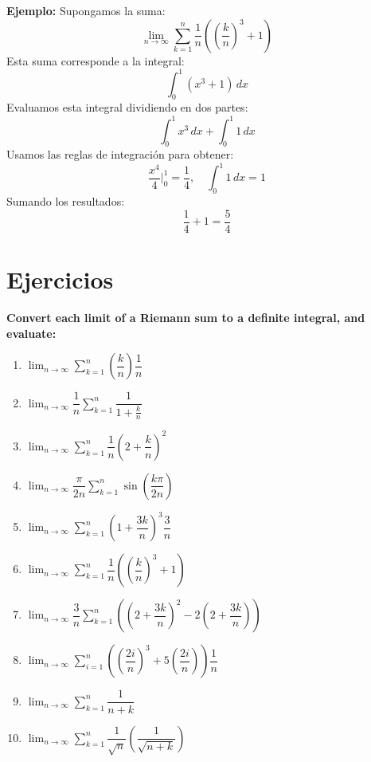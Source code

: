 \documentclass[answers]{exam} %
\begin{document}
\textbf{Ejemplo:}
Supongamos la suma:
\[
\lim_{n \to \infty} \sum_{k=1}^{n} \frac{1}{n} \left( \left( \frac{k}{n} \right)^3 + 1 \right)
\]
Esta suma corresponde a la integral:
\[
\int_0^1 (x^3 + 1) \, dx
\]
Evaluamos esta integral dividiendo en dos partes:
\[
\int_0^1 x^3 \, dx + \int_0^1 1 \, dx
\]
Usamos las reglas de integración para obtener:
\[
\frac{x^4}{4} \Big|_0^1 = \frac{1}{4}, \quad \int_0^1 1 \, dx = 1
\]
Sumando los resultados:
\[
\frac{1}{4} + 1 = \frac{5}{4}
\]




\section{Ejercicios}

    \large\textbf{Convert each limit of a Riemann sum to a definite integral, and evaluate: }

    \begin{enumerate}[label=\alph*.]
        \item $\displaystyle \lim_{n\to\infty} \sum_{k = 1}^{n} \left(\dfrac{k}{n} \right) \dfrac{1} {n}$
        
        \item $\displaystyle \lim_{n\to\infty} \dfrac{1}{n} \sum_{k = 1}^{n} \dfrac{1} {1+\frac{k}{n}}$
        
        \item $\displaystyle \lim_{n\to\infty} \sum_{k = 1}^{n} \dfrac{1}{n} \left(2+\dfrac{k}{n}\right)^2$
        
        \item $\displaystyle \lim_{n\to\infty} \dfrac{\pi}{2n} \sum_{k = 1}^{n} \sin \left(\dfrac{k\pi}{2n}\right)$
        
        \item $\displaystyle \lim_{n\to\infty} \sum_{k = 1}^{n} \left(1+ \dfrac{3k}{n}\right)^3 \dfrac{3}{n}$
        
        \item $\displaystyle \lim_{n\to\infty} \sum_{k = 1}^{n} \dfrac{1}{n} \left(\left(\dfrac{k}{n}\right) ^3 + 1\right)$
        
        \item $\displaystyle \lim_{n\to\infty} \dfrac{3}{n} \sum_{k = 1}^{n} \left(\left(2+ \dfrac{3k}{n}\right) ^2- 2\left(2+\dfrac{3k}{n}\right)\right) $
        
        \item $\displaystyle \lim_{n\to\infty} \sum_{i = 1}^{n} \left(\left(\dfrac{2i}{n}\right) ^3 + 5\left(\dfrac{2i}{n}\right)\right)  \dfrac{1}{n} $
        
        \item $\displaystyle \lim_{n\to\infty} \sum_{k = 1}^{n} \dfrac{1}{n+k}$
        \item $\displaystyle \lim_{n\to\infty} \sum_{k = 1}^{n} \dfrac{1}{\sqrt{n}} \left(\dfrac{1}{\sqrt{n+k}}\right)$
    \end{enumerate}
    \vspace{0.5cm}
\end{document}
